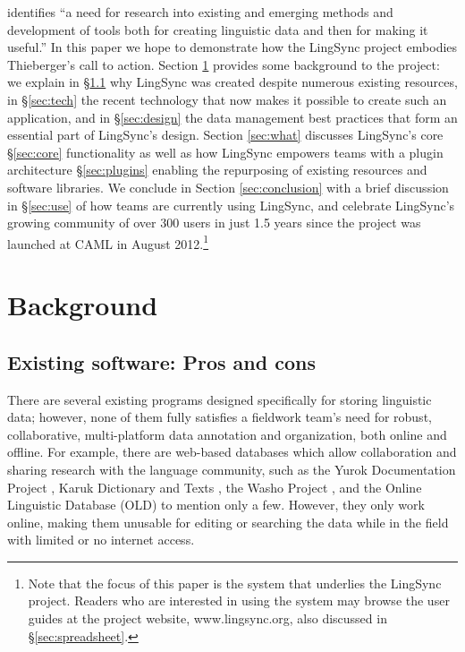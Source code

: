 \documentclass[letterpaper, 12pt, dvips]{mitwpl}
\begin{document}
\cite{Thieberger:2012} identifies ``a need for research into existing and emerging methods and development of tools both for creating linguistic data and then for making it useful.'' 
In this paper we hope to demonstrate how the LingSync project embodies Thieberger's call to action. Section \ref{sec:background} provides some background to the project: we explain in \S \ref{sec:why} why  LingSync was created despite numerous existing resources, in \S \ref{sec:tech} the recent technology that now makes it possible to create such an application,  and in  \S \ref{sec:design} the data management best practices that form an essential part of LingSync's design. 
Section \ref{sec:what} discusses LingSync's core \S \ref{sec:core} functionality as well as how LingSync empowers teams  with a plugin architecture \S  \ref{sec:plugins} enabling the  repurposing of existing resources and software libraries. We conclude in Section \ref{sec:conclusion} with a brief discussion in \S \ref{sec:use} of how teams are currently using LingSync, and celebrate LingSync's  growing community of over 300 users in just 1.5 years since the project was launched at CAML in August 2012.\footnote{Note that the focus of this paper is the system  that underlies the LingSync project. Readers who are interested in using the system may browse the user guides at the project website, www.lingsync.org, also discussed in \S\ref{sec:spreadsheet}.} 


\section{Background}
\label{sec:background}



\subsection{Existing software: Pros and cons}
\label{sec:why}


There are several existing programs designed specifically for storing linguistic data; however,
none of them fully satisfies a fieldwork team's need for robust,
collaborative,
multi-platform data annotation and organization,
both online and offline.
For example,
there are web-based databases which allow collaboration and sharing research with the language community,
such as 
the Yurok Documentation Project \citep{Yurok:2001:Online},
 Karuk Dictionary and Texts \citep{Karuk:2009:Online},
the Washo Project \citep{Washo:2005:Online, WashoMobile:2008:Online, Cihlar:2008}, 
and the Online Linguistic Database (OLD) \citep{OLD:2010:Online} to mention only a few. 
However, they only work online,
making them unusable for editing or searching the data while in the field with limited or no internet access.
\end{document}
